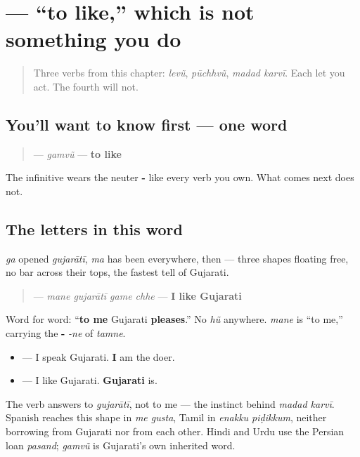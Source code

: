 \section[\texorpdfstring{\gu{ગમવું} (gamvũ)}{ગમવું (gamvũ)}]{ — \textquotedblleft{}to like,\textquotedblright{} which is not something you do}

\label{lesson:GU-C09-gamvun}



\begin{quote}
Three verbs from this chapter: \emph{levũ}, \emph{pūchhvũ}, \emph{madad karvī}. Each let you act. The fourth will not.
\end{quote}

\subsection*{You'll want to know first — one word}
\begin{quote}
\textbf{} — \emph{gamvũ} — \textbf{to like}
\end{quote}

The infinitive wears the neuter \textbf{-} like every verb you own. What comes next does not.

\subsection*{The letters in this word}
\textbf{} \emph{ga} opened \emph{gujarātī}, \textbf{} \emph{ma} has been everywhere, then \textbf{} — three shapes floating free, no bar across their tops, the fastest tell of Gujarati.

\begin{grammarlens}[title={Grammar Lens: you are not the subject of this sentence}]
\begin{quote}
\textbf{   } — \emph{mane gujarātī game chhe} — \textbf{I like Gujarati}
\end{quote}

Word for word: \textquotedblleft{}\textbf{to me} Gujarati \textbf{pleases}.\textquotedblright{} No \emph{hũ} anywhere. \textbf{} \emph{mane} is \textquotedblleft{}to me,\textquotedblright{} carrying the \textbf{-} \emph{-ne} of \textbf{} \emph{tamne}.

\begin{itemize}
\raggedright
  \item \textbf{   } — I speak Gujarati. \textbf{I} am the doer.
  \item \textbf{   } — I like Gujarati. \textbf{Gujarati} is.
\end{itemize}

The verb answers to \emph{gujarātī}, not to me — the instinct behind \emph{madad karvī}. Spanish reaches this shape in \emph{me gusta}, Tamil in \emph{enakku piḍikkum}, neither borrowing from Gujarati nor from each other. Hindi and Urdu use the Persian loan \emph{pasand}; \emph{gamvũ} is Gujarati's own inherited word.
\end{grammarlens}

